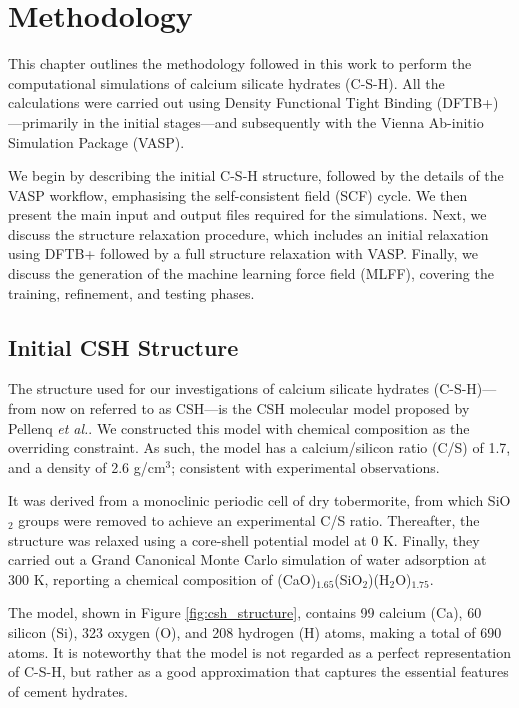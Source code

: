 \chapter{Methodology}
\label{Chapeter3}
This chapter outlines the methodology followed in this work to perform the computational simulations of calcium silicate hydrates (C-S-H). All the calculations were carried out using Density Functional Tight Binding (DFTB+)---primarily in the initial stages---and subsequently with the Vienna Ab-initio Simulation Package (VASP).

We begin by describing the initial C-S-H structure, followed by the 
details of the VASP workflow, emphasising the self-consistent field (SCF) cycle. We then present the main input and output files required for the simulations. Next, we discuss the structure relaxation procedure, which includes an initial relaxation using DFTB+ followed by a full structure relaxation with VASP. Finally, we discuss the generation of the machine learning force field (MLFF), covering the training, refinement, and testing phases. 

\section{Initial CSH Structure}
\label{sec:csh-structure}
The structure used for our investigations of calcium silicate hydrates (C-S-H)---from now on referred to as CSH---is the CSH molecular model proposed by Pellenq \emph{et al.}\supercite{Pellenq2009}. We constructed this model with chemical composition as the overriding constraint. As such, the model has a calcium/silicon ratio (C/S) of 1.7, and a density of 2.6 g/cm$^3$; consistent with experimental observations. 

It was derived from a monoclinic periodic cell of dry tobermorite, from which SiO$_2$ groups were removed to achieve an experimental C/S ratio. Thereafter, the structure was relaxed using a core-shell potential model at 0 K. Finally, they carried out a Grand Canonical Monte Carlo simulation of water adsorption at 300 K, reporting a chemical composition of (CaO)$_{1.65}$(SiO$_2$)(H$_2$O)$_{1.75}$. 

The model, shown in Figure \ref{fig:csh_structure}, contains
99 calcium (Ca), 60 silicon (Si), 323 oxygen (O), and 208 hydrogen (H) atoms, making a total of 690 atoms. It is noteworthy that the model is not regarded as a perfect representation of C-S-H, but rather as a good approximation that captures the essential features of cement hydrates.

